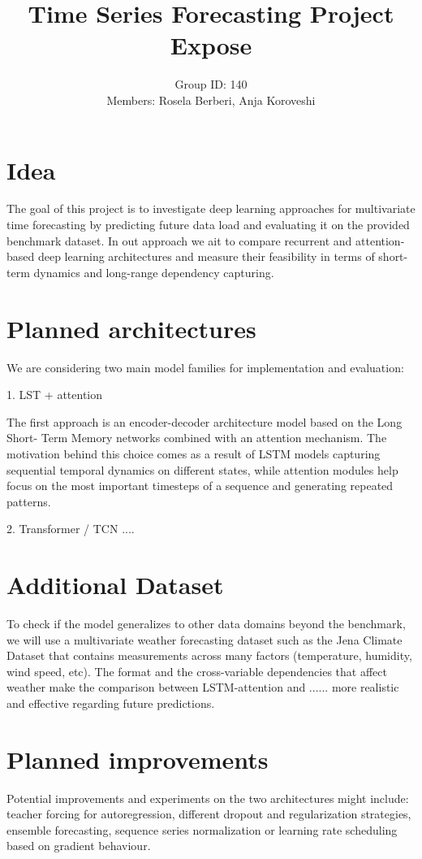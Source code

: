 \documentclass[11pt]{article}
\title{Time Series Forecasting Project Expose}
\author{Group ID: 140 \\ Members: Rosela Berberi, Anja Koroveshi}
\date{}
\begin{document}
\maketitle

\section{Idea}
The goal of this project is to investigate deep learning approaches for multivariate
time forecasting by predicting future data load and evaluating it on the provided
benchmark dataset. In out approach we ait to compare recurrent and attention-based 
deep learning architectures and measure their feasibility in terms of short-term 
dynamics and long-range dependency capturing.

\section{Planned architectures}
We are considering two main model families for implementation and evaluation:

1. LST + attention

The first approach is an encoder-decoder architecture model based on the Long Short-
Term Memory networks combined with an attention mechanism. The motivation behind this
choice comes as a result of LSTM models capturing sequential temporal dynamics on 
different states, while attention modules help focus on the most important timesteps 
of a sequence and generating repeated patterns.

2. Transformer / TCN ....

\section{Additional Dataset}
To check if the model generalizes to other data domains beyond the benchmark, we will
use a multivariate weather forecasting dataset such as the Jena Climate Dataset that 
contains measurements across many factors (temperature, humidity, wind speed, etc). 
The format and the cross-variable dependencies that affect weather make the comparison 
between LSTM-attention and ...... more realistic and effective regarding future predictions. 

\section{Planned improvements}
Potential improvements and experiments on the two architectures might include: teacher 
forcing for autoregression, different dropout and regularization strategies, ensemble 
forecasting, sequence series normalization or learning rate scheduling based on gradient 
behaviour. 
\end{document}
